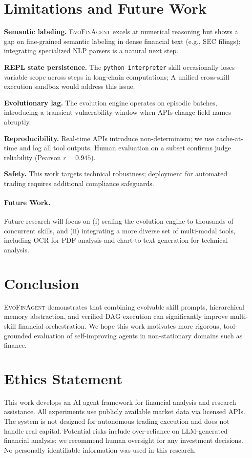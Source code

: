 \documentclass{article}
\begin{document}
\section{Limitations and Future Work}
\label{sec:limitations}

\textbf{Semantic labeling.} \textsc{EvoFinAgent} excels at numerical reasoning but shows a gap on fine-grained semantic labeling in dense financial text (e.g., SEC filings); integrating specialized NLP parsers is a natural next step.

\textbf{REPL state persistence.} The \texttt{python\_interpreter} skill occasionally loses variable scope across steps in long-chain computations; A unified cross-skill execution sandbox would address this issue.

\textbf{Evolutionary lag.} The evolution engine operates on episodic batches, introducing a transient vulnerability window when APIs change field names abruptly.

\textbf{Reproducibility.} Real-time APIs introduce non-determinism; we use cache-at-time and log all tool outputs. Human evaluation on a subset confirms judge reliability (Pearson $r=0.945$).

\textbf{Safety.} This work targets technical robustness; deployment for automated trading requires additional compliance safeguards.

\paragraph{Future Work.}
Future research will focus on (i) scaling the evolution engine to thousands of concurrent skills, and (ii) integrating a more diverse set of multi-modal tools, including OCR for PDF analysis and chart-to-text generation for technical analysis.

\section{Conclusion}
\textsc{EvoFinAgent} demonstrates that combining evolvable skill prompts, hierarchical memory abstraction, and verified DAG execution can significantly improve multi-skill financial orchestration. We hope this work motivates more rigorous, tool-grounded evaluation of self-improving agents in non-stationary domains such as finance.

\section*{Ethics Statement}
This work develops an AI agent framework for financial analysis and research assistance. All experiments use publicly available market data via licensed APIs. The system is not designed for autonomous trading execution and does not handle real capital. Potential risks include over-reliance on LLM-generated financial analysis; we recommend human oversight for any investment decisions. No personally identifiable information was used in this research.
\end{document}
